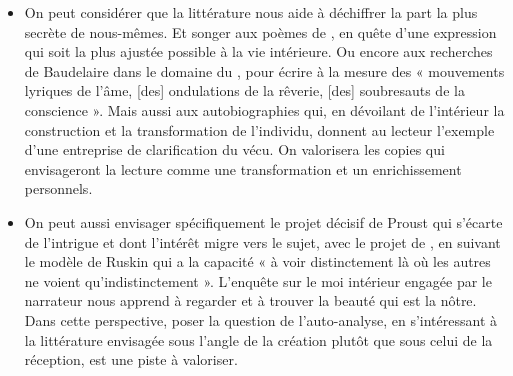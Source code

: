 {\begin{itemize}
\item On peut considérer que la littérature nous aide à déchiffrer la part la plus secrète de
nous-mêmes. Et songer aux poèmes de , en quête d’une expression
qui soit la plus ajustée possible à la vie intérieure. Ou encore aux recherches de
Baudelaire dans le domaine du , pour écrire à la mesure des
« mouvements lyriques de l’âme, [des] ondulations de la rêverie, [des] soubresauts de
la conscience ». Mais aussi aux autobiographies qui, en dévoilant de l’intérieur la
construction et la transformation de l’individu, donnent au lecteur l’exemple d’une
entreprise de clarification du vécu. On valorisera les copies qui envisageront la lecture
comme une transformation et un enrichissement personnels.

\item On peut aussi envisager spécifiquement le projet décisif de Proust qui s’écarte de
l’intrigue et dont l’intérêt migre vers le sujet, avec le projet de , en suivant le modèle de Ruskin
qui a la capacité « à voir distinctement là où les autres ne voient qu’indistinctement ».
L’enquête sur le moi intérieur engagée par le narrateur nous apprend à regarder et à
trouver la beauté qui est la nôtre. Dans cette perspective, poser la question de l’auto-analyse, en s’intéressant à la littérature envisagée sous l’angle de la création plutôt
que sous celui de la réception, est une piste à valoriser.
\end{itemize}}%


